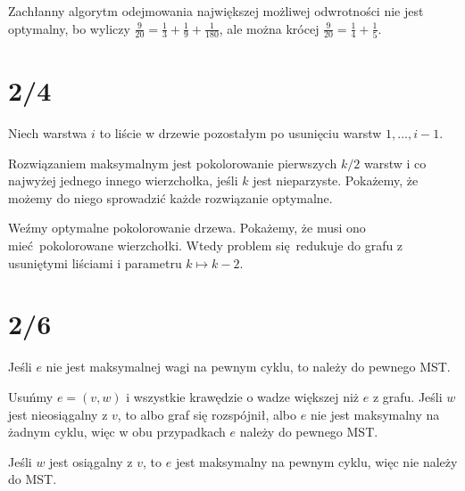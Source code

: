 \documentclass[a4paper, 12pt]{article}
\newcommand{\+}{\enspace}
\begin{document}
Zachłanny algorytm odejmowania największej możliwej odwrotności
nie jest optymalny, bo wyliczy
$\frac{9}{20} = \frac{1}{3} + \frac{1}{9} + \frac{1}{180}$,
ale można krócej $\frac{9}{20} = \frac{1}{4} + \frac{1}{5}$.

\section*{2/4}
Niech warstwa $i$ to liście w drzewie pozostałym po usunięciu warstw $1, …, i-1$.

Rozwiązaniem maksymalnym jest pokolorowanie pierwszych $k/2$ warstw i
co najwyżej jednego innego wierzchołka, jeśli $k$ jest nieparzyste.
Pokażemy, że możemy do niego sprowadzić każde rozwiązanie optymalne.

Weźmy optymalne pokolorowanie drzewa.
Pokażemy, że musi ono mieć pokolorowane wierzchołki.
Wtedy problem się redukuje do grafu z usuniętymi liściami i parametru $k ↦ k-2$.

\section*{2/6}
Jeśli $e$ nie jest maksymalnej wagi na pewnym cyklu, to należy do pewnego MST.

Usuńmy $e=(v,w)$ i wszystkie krawędzie o wadze większej niż $e$ z grafu.
Jeśli $w$ jest nieosiągalny z $v$, to albo graf się rozspójnił, albo $e$ nie jest
maksymalny na żadnym cyklu, więc w obu przypadkach $e$ należy do pewnego MST.

Jeśli $w$ jest osiągalny z $v$, to $e$ jest maksymalny na pewnym cyklu,
więc nie należy do MST.
\end{document}

